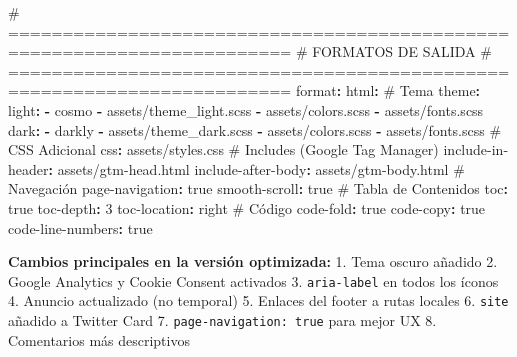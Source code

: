 \documentclass[
  doc,
  floatsintext,
  longtable,
  a4paper,
  nolmodern,
  notxfonts,
  notimes,
  12pt,
  colorlinks=true,linkcolor=blue,citecolor=blue,urlcolor=blue]{apa7}
\newenvironment{Shaded}{\begin{snugshade}}{\end{snugshade}}
\newcommand{\AttributeTok}[1]{\textcolor[rgb]{0.40,0.45,0.13}{#1}}
\newcommand{\CharTok}[1]{\textcolor[rgb]{0.13,0.47,0.30}{#1}}
\newcommand{\CommentTok}[1]{\textcolor[rgb]{0.37,0.37,0.37}{#1}}
\newcommand{\DecValTok}[1]{\textcolor[rgb]{0.68,0.00,0.00}{#1}}
\newcommand{\FunctionTok}[1]{\textcolor[rgb]{0.28,0.35,0.67}{#1}}
\newcommand{\KeywordTok}[1]{\textcolor[rgb]{0.00,0.23,0.31}{\textbf{#1}}}
\begin{document}
\begin{Shaded}
\begin{Highlighting}[]
\CommentTok{\# ========================================================================}
\CommentTok{\# FORMATOS DE SALIDA}
\CommentTok{\# ========================================================================}
\FunctionTok{format}\KeywordTok{:}
\AttributeTok{  }\FunctionTok{html}\KeywordTok{:}
\CommentTok{    \# Tema}
\AttributeTok{    }\FunctionTok{theme}\KeywordTok{:}
\AttributeTok{      }\FunctionTok{light}\KeywordTok{:}
\AttributeTok{        }\KeywordTok{{-}}\AttributeTok{ cosmo}
\AttributeTok{        }\KeywordTok{{-}}\AttributeTok{ assets/theme\_light.scss}
\AttributeTok{        }\KeywordTok{{-}}\AttributeTok{ assets/colors.scss}
\AttributeTok{        }\KeywordTok{{-}}\AttributeTok{ assets/fonts.scss}
\AttributeTok{      }\FunctionTok{dark}\KeywordTok{:}
\AttributeTok{        }\KeywordTok{{-}}\AttributeTok{ darkly}
\AttributeTok{        }\KeywordTok{{-}}\AttributeTok{ assets/theme\_dark.scss}
\AttributeTok{        }\KeywordTok{{-}}\AttributeTok{ assets/colors.scss}
\AttributeTok{        }\KeywordTok{{-}}\AttributeTok{ assets/fonts.scss}
\AttributeTok{        }
\CommentTok{    \# CSS Adicional}
\AttributeTok{    }\FunctionTok{css}\KeywordTok{:}\AttributeTok{ assets/styles.css}
\AttributeTok{    }
\CommentTok{    \# Includes (Google Tag Manager)}
\AttributeTok{    }\FunctionTok{include{-}in{-}header}\KeywordTok{:}\AttributeTok{ assets/gtm{-}head.html}
\AttributeTok{    }\FunctionTok{include{-}after{-}body}\KeywordTok{:}\AttributeTok{ assets/gtm{-}body.html}
\AttributeTok{    }
\CommentTok{    \# Navegación}
\AttributeTok{    }\FunctionTok{page{-}navigation}\KeywordTok{:}\AttributeTok{ }\CharTok{true}
\AttributeTok{    }\FunctionTok{smooth{-}scroll}\KeywordTok{:}\AttributeTok{ }\CharTok{true}
\AttributeTok{    }
\CommentTok{    \# Tabla de Contenidos}
\AttributeTok{    }\FunctionTok{toc}\KeywordTok{:}\AttributeTok{ }\CharTok{true}
\AttributeTok{    }\FunctionTok{toc{-}depth}\KeywordTok{:}\AttributeTok{ }\DecValTok{3}
\AttributeTok{    }\FunctionTok{toc{-}location}\KeywordTok{:}\AttributeTok{ right}
\AttributeTok{    }
\CommentTok{    \# Código}
\AttributeTok{    }\FunctionTok{code{-}fold}\KeywordTok{:}\AttributeTok{ }\CharTok{true}
\AttributeTok{    }\FunctionTok{code{-}copy}\KeywordTok{:}\AttributeTok{ }\CharTok{true}
\AttributeTok{    }\FunctionTok{code{-}line{-}numbers}\KeywordTok{:}\AttributeTok{ }\CharTok{true}
\end{Highlighting}
\end{Shaded}

\textbf{Cambios principales en la versión optimizada:} 1. Tema oscuro
añadido 2. Google Analytics y Cookie Consent activados 3.
\texttt{aria-label} en todos los íconos 4. Anuncio actualizado (no
temporal) 5. Enlaces del footer a rutas locales 6. \texttt{site} añadido
a Twitter Card 7. \texttt{page-navigation:\ true} para mejor UX 8.
Comentarios más descriptivos
\end{document}
